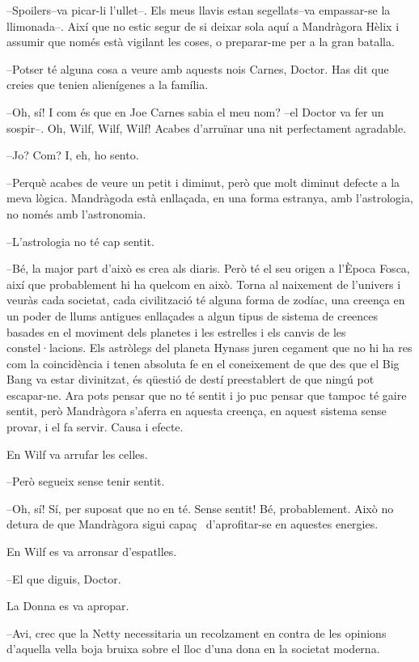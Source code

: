 --Spoilers--va picar-li l'ullet--. Els meus llavis estan segellats--va
empassar-se la llimonada--. Així que no estic segur de si deixar sola
aquí a Mandràgora Hèlix i assumir que només està vigilant les coses, o
preparar-me per a la gran batalla.

--Potser té alguna cosa a veure amb aquests nois Carnes, Doctor. Has dit
que creies que tenien alienígenes a la família.

--Oh, sí! I com és que en Joe Carnes sabia el meu nom? --el Doctor va
fer un sospir--. Oh, Wilf, Wilf, Wilf! Acabes d'arruïnar una nit
perfectament agradable.

--Jo? Com? I, eh, ho sento.

--Perquè acabes de veure un petit i diminut, però que molt diminut
defecte a la meva lògica. Mandràgoda està enllaçada, en una forma
estranya, amb l'astrologia, no només amb l'astronomia.

--L'astrologia no té cap sentit.

--Bé, la major part d'això es crea als diaris. Però té el seu origen a
l'Època Fosca, així que probablement hi ha quelcom en això. Torna al
naixement de l'univers i veuràs cada societat, cada civilització té
alguna forma de zodíac, una creença en un poder de llums antigues
enllaçades a algun tipus de sistema de creences basades en el moviment
dels planetes i les estrelles i els canvis de les constel·lacions. Els
astròlegs del planeta Hynass juren cegament que no hi ha res com la
coincidència i tenen absoluta fe en el coneixement de que des que el Big
Bang va estar divinitzat, és qüestió de destí preestablert de que ningú
pot escapar-ne. Ara pots pensar que no té sentit i jo puc pensar que
tampoc té gaire sentit, però Mandràgora s'aferra en aquesta creença, en
aquest sistema sense provar, i el fa servir. Causa i efecte.

En Wilf va arrufar les celles.

--Però segueix sense tenir sentit.

--Oh, sí! Sí, per suposat que no en té. Sense sentit! Bé, probablement.
Això no detura de que Mandràgora sigui capaç ~d'aprofitar-se en aquestes
energies.

En Wilf es va arronsar d'espatlles.

--El que diguis, Doctor.

La Donna es va apropar.

--Avi, crec que la Netty necessitaria un recolzament en contra de les
opinions d'aquella vella boja bruixa sobre el lloc d'una dona en la
societat moderna.

